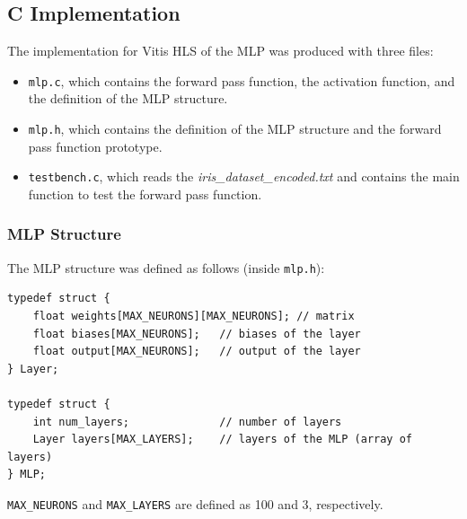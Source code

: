 \documentclass{article}
\begin{document}
\subsection{C Implementation}

The implementation for Vitis HLS of the MLP was produced with three files:
\begin{itemize}
    \item \texttt{mlp.c}, which contains the forward pass function, the activation function, and the definition of the MLP structure.
    \item \texttt{mlp.h}, which contains the definition of the MLP structure and the forward pass function prototype.
    \item \texttt{testbench.c}, which reads the \textit{iris\_dataset\_encoded.txt}  and contains the main function to test the forward pass function.
\end{itemize}

\subsubsection{MLP Structure}
The MLP structure was defined as follows (inside \texttt{mlp.h}):
\begin{lstlisting}
typedef struct {
    float weights[MAX_NEURONS][MAX_NEURONS]; // matrix
    float biases[MAX_NEURONS];   // biases of the layer
    float output[MAX_NEURONS];   // output of the layer
} Layer;

typedef struct {
    int num_layers;              // number of layers
    Layer layers[MAX_LAYERS];    // layers of the MLP (array of layers)
} MLP;
\end{lstlisting}

\texttt{MAX\_NEURONS} and \texttt{MAX\_LAYERS} are defined as 100 and 3, respectively.
\end{document}
